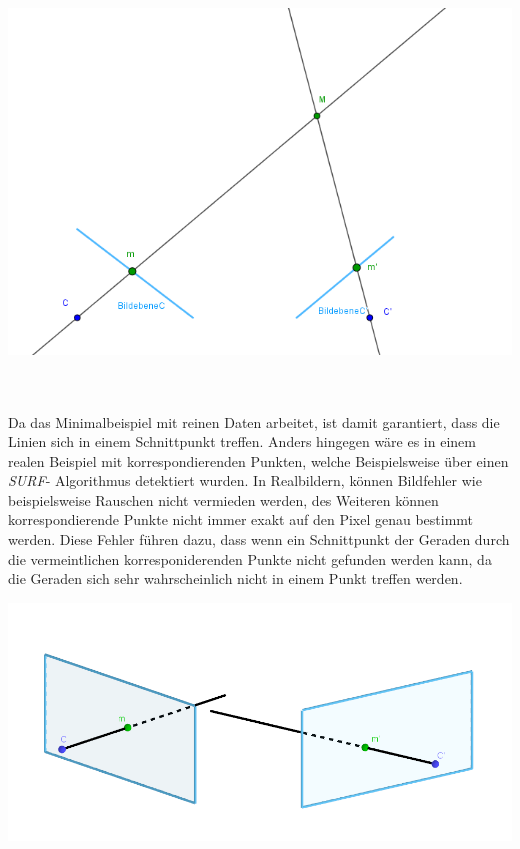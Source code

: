 \begin{minipage}{\linewidth}
	\centering
	\includegraphics[width=0.8\linewidth]{images/optimaleTriangulierung.png}
\end{minipage}\\ \\


Da das Minimalbeispiel mit reinen Daten arbeitet, ist damit garantiert, dass die Linien sich in einem Schnittpunkt treffen. Anders hingegen wäre es in einem realen Beispiel mit korrespondierenden Punkten, welche Beispielsweise über einen \textit{SURF}- Algorithmus detektiert wurden\cite{Mandun}. In Realbildern, können Bildfehler wie beispielsweise Rauschen nicht vermieden werden, des Weiteren können korrespondierende Punkte nicht immer exakt auf den Pixel genau bestimmt werden. Diese Fehler führen dazu, dass wenn ein Schnittpunkt der Geraden durch die vermeintlichen korresponiderenden Punkte nicht gefunden werden kann, da die Geraden sich sehr wahrscheinlich nicht in einem Punkt treffen werden\cite{Mandun,HZ}. 


\begin{minipage}{\linewidth}
	\centering
	\includegraphics[width=0.8\linewidth]{images/problemTriangulation.png}
\end{minipage}\\ 

